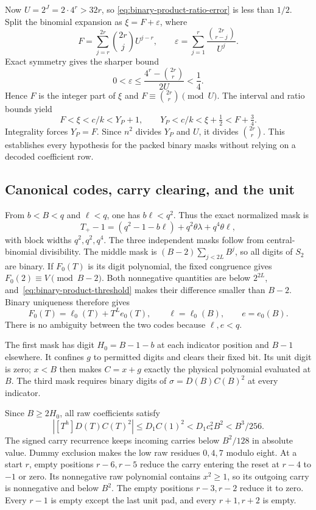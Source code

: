 Now $U=2^J=2\cdot4^r>32r$, so
\eqref{eq:binary-product-ratio-error} is less than $1/2$. Split the
binomial expansion as $\xi=F+\varepsilon$, where
\begin{equation}\label{eq:binary-product-binomial-split}
 F=\sum_{j=r}^{2r}\binom{2r}{j}U^{j-r},
 \qquad
 \varepsilon=\sum_{j=1}^{r}\frac{\binom{2r}{r-j}}{U^j}.
\end{equation}
Exact symmetry gives the sharper bound
\begin{equation}\label{eq:binary-product-tail}
 0<\varepsilon
 \le\frac{4^r-\binom{2r}{r}}{2U}<\frac14.
\end{equation}
Hence $F$ is the integer part of $\xi$ and
$F\equiv\binom{2r}{r}\pmod U$. The interval and ratio bounds yield
\[
 F<\xi<c/k<Y_P+1,\qquad
 Y_P<c/k<\xi+\tfrac12<F+\tfrac34.
\]
Integrality forces $Y_P=F$. Since $n^2$ divides $Y_P$ and $U$, it
divides $\binom{2r}{r}$. This establishes every hypothesis for the
packed binary masks without relying on a decoded coefficient row.

\subsection{Canonical codes, carry clearing, and the unit}

From $b<B<q$ and $\ell<q$, one has $b\ell<q^2$. Thus the exact
normalized mask is
\[
 T_+-1=(q^2-1-b\ell)+q^2\theta\lambda+q^4\theta\ell,
\]
with block widths $q^2,q^2,q^4$. The three independent masks follow
from central-binomial divisibility. The middle mask is
$(B-2)\sum_{j<2L}B^j$, so all digits of $S_2$ are binary. If $F_0(T)$
is its digit polynomial, the fixed congruence gives
$F_0(2)\equiv V\pmod{B-2}$. Both nonnegative quantities are below
$2^{2L}$, and~\eqref{eq:binary-product-threshold} makes their
difference smaller than $B-2$. Binary uniqueness therefore gives
\[
 F_0(T)=\ell_0(T)+T^Le_0(T),\qquad
 \ell=\ell_0(B),\qquad e=e_0(B).
\]
There is no ambiguity between the two codes because $\ell,e<q$.

The first mask has digit $H_0=B-1-b$ at each indicator position and
$B-1$ elsewhere. It confines $g$ to permitted digits and clears
their fixed bit. Its unit digit is zero; $x<B$ then makes $C=x+g$
exactly the physical polynomial evaluated at $B$. The third mask
requires binary digits of $\sigma=D(B)C(B)^2$ at every indicator.

Since $B\ge2H_0$, all raw coefficients satisfy
\[
 |[T^h]D(T)C(T)^2|
 \le D_1C(1)^2<D_1c_*^2B^2<B^3/256.
\]
The signed carry recurrence keeps incoming carries below $B^2/128$
in absolute value. Dummy exclusion makes the low raw residues
$0,4,7$ modulo eight. At a start $r$, empty positions $r-6,r-5$
reduce the carry entering the reset at $r-4$ to $-1$ or zero.
Its nonnegative raw polynomial contains $x^2\ge1$, so its outgoing
carry is nonnegative and below $B^2$. The empty positions $r-3,r-2$
reduce it to zero. Every $r-1$ is empty except the last unit pad,
and every $r+1,r+2$ is empty.

